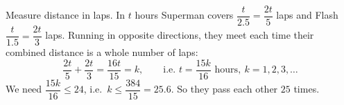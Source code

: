 Measure distance in laps. In $t$ hours Superman covers $\dfrac{t}{2.5}=\dfrac{2t}{5}$ laps and Flash $\dfrac{t}{1.5}=\dfrac{2t}{3}$ laps. Running in opposite directions, they meet each time their combined distance is a whole number of laps:
\[
\dfrac{2t}{5}+\dfrac{2t}{3}=\dfrac{16t}{15}=k,\qquad\text{i.e. } t=\dfrac{15k}{16}\text{ hours},\ k=1,2,3,\dots
\]
We need $\dfrac{15k}{16}\le24$, i.e.\ $k\le\dfrac{384}{15}=25.6$. So they pass each other $\boxed{25}$ times.
